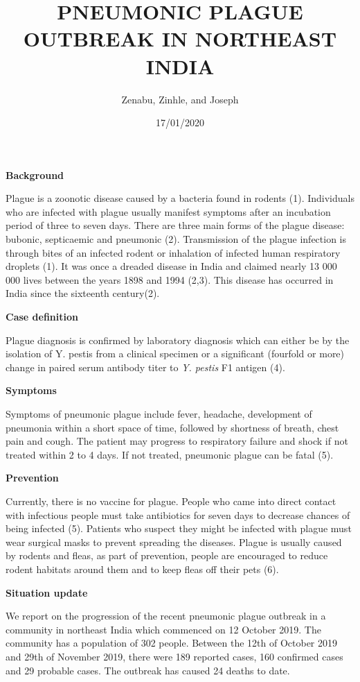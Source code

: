 \documentclass[
]{article}
\title{PNEUMONIC PLAGUE OUTBREAK IN NORTHEAST INDIA}
\author{Zenabu, Zinhle, and Joseph}
\date{17/01/2020}
\begin{document}
\maketitle

{
\setcounter{tocdepth}{2}
\tableofcontents
}
\textbf{Background}

Plague is a zoonotic disease caused by a bacteria found in rodents (1).
Individuals who are infected with plague usually manifest symptoms after
an incubation period of three to seven days. There are three main forms
of the plague disease: bubonic, septicaemic and pneumonic (2).
Transmission of the plague infection is through bites of an infected
rodent or inhalation of infected human respiratory droplets (1). It was
once a dreaded disease in India and claimed nearly 13 000 000 lives
between the years 1898 and 1994 (2,3). This disease has occurred in
India since the sixteenth century(2).

\textbf{Case definition}

Plague diagnosis is confirmed by laboratory diagnosis which can either
be by the isolation of Y. pestis from a clinical specimen or a
significant (fourfold or more) change in paired serum antibody titer to
\emph{Y. pestis} F1 antigen (4).

\textbf{Symptoms}

Symptoms of pneumonic plague include fever, headache, development of
pneumonia within a short space of time, followed by shortness of breath,
chest pain and cough. The patient may progress to respiratory failure
and shock if not treated within 2 to 4 days. If not treated, pneumonic
plague can be fatal (5).

\textbf{Prevention}

Currently, there is no vaccine for plague. People who came into direct
contact with infectious people must take antibiotics for seven days to
decrease chances of being infected (5). Patients who suspect they might
be infected with plague must wear surgical masks to prevent spreading
the diseases. Plague is usually caused by rodents and fleas, as part of
prevention, people are encouraged to reduce rodent habitats around them
and to keep fleas off their pets (6).

\textbf{Situation update}

We report on the progression of the recent pneumonic plague outbreak in
a community in northeast India which commenced on 12 October 2019. The
community has a population of 302 people. Between the 12th of October
2019 and 29th of November 2019, there were 189 reported cases, 160
confirmed cases and 29 probable cases. The outbreak has caused 24 deaths
to date.
\end{document}
